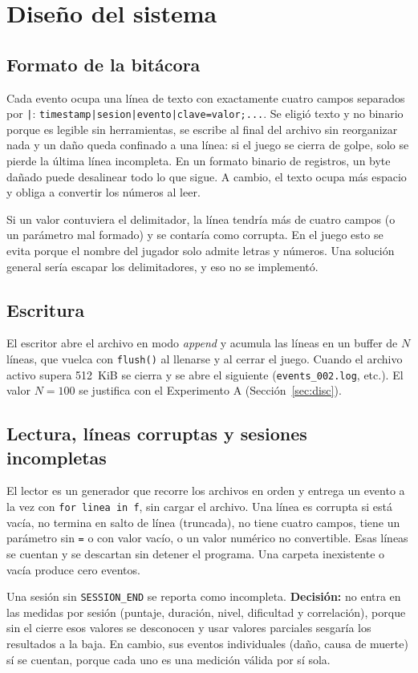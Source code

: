 \documentclass[conference]{IEEEtran}
\begin{document}
\section{Diseño del sistema}
\subsection{Formato de la bitácora}
Cada evento ocupa una línea de texto con exactamente cuatro campos separados por \texttt{|}: \texttt{timestamp|sesion|evento|clave=valor;...}. Se eligió texto y no binario porque es legible sin herramientas, se escribe al final del archivo sin reorganizar nada y un daño queda confinado a una línea: si el juego se cierra de golpe, solo se pierde la última línea incompleta. En un formato binario de registros, un byte dañado puede desalinear todo lo que sigue. A cambio, el texto ocupa más espacio y obliga a convertir los números al leer.

Si un valor contuviera el delimitador, la línea tendría más de cuatro campos (o un parámetro mal formado) y se contaría como corrupta. En el juego esto se evita porque el nombre del jugador solo admite letras y números. Una solución general sería escapar los delimitadores, y eso no se implementó.

\subsection{Escritura}
El escritor abre el archivo en modo \emph{append} y acumula las líneas en un buffer de $N$ líneas, que vuelca con \texttt{flush()} al llenarse y al cerrar el juego. Cuando el archivo activo supera 512~KiB se cierra y se abre el siguiente (\texttt{events\_002.log}, etc.). El valor $N=100$ se justifica con el Experimento A (Sección~\ref{sec:disc}).

\subsection{Lectura, líneas corruptas y sesiones incompletas}
El lector es un generador que recorre los archivos en orden y entrega un evento a la vez con \texttt{for linea in f}, sin cargar el archivo. Una línea es corrupta si está vacía, no termina en salto de línea (truncada), no tiene cuatro campos, tiene un parámetro sin \texttt{=} o con valor vacío, o un valor numérico no convertible. Esas líneas se cuentan y se descartan sin detener el programa. Una carpeta inexistente o vacía produce cero eventos.

Una sesión sin \texttt{SESSION\_END} se reporta como incompleta. \textbf{Decisión:} no entra en las medidas por sesión (puntaje, duración, nivel, dificultad y correlación), porque sin el cierre esos valores se desconocen y usar valores parciales sesgaría los resultados a la baja. En cambio, sus eventos individuales (daño, causa de muerte) sí se cuentan, porque cada uno es una medición válida por sí sola.
\end{document}
